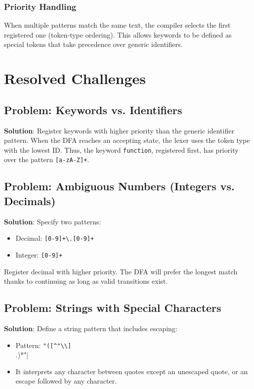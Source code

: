 \documentclass[12pt,a4paper]{report}
\begin{document}
\subsubsection{Priority Handling}

When multiple patterns match the same text, the compiler selects the first registered one (token-type ordering).
This allows keywords to be defined as special tokens that take precedence over generic identifiers.
\section{Resolved Challenges}

\subsection{Problem: Keywords vs. Identifiers}

\textbf{Solution}: Register keywords with higher priority than the generic identifier pattern.
When the DFA reaches an accepting state, the lexer uses the token type with the lowest ID.
Thus, the keyword \texttt{function}, registered first, has priority over the pattern \verb|[a-zA-Z]+|.

\subsection{Problem: Ambiguous Numbers (Integers vs. Decimals)}

\textbf{Solution}: Specify two patterns:
\begin{itemize}
    \item Decimal: \verb|[0-9]+\.[0-9]+|
    \item Integer: \verb|[0-9]+|
\end{itemize}

Register decimal with higher priority.
The DFA will prefer the longest match thanks to continuing as long as valid transitions exist.

\subsection{Problem: Strings with Special Characters}

\textbf{Solution}: Define a string pattern that includes escaping:
\begin{itemize}
    \item Pattern: \verb|"([^"\\]|\\.)*"|
    \item It interprets any character between quotes except an unescaped quote, or an escape followed by any character.
\end{itemize}
\end{document}
